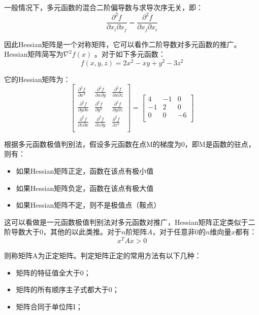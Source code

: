 \documentclass[12pt]{article}
\begin{document}
一般情况下，多元函数的混合二阶偏导数与求导次序无关\cite{Understand_Convex_Optimization}，即：
$$
\frac{\partial^2 f}{\partial x_i\partial x_j} = \frac{\partial^2 f}{\partial x_j\partial x_i}
$$

因此Hessian矩阵是一个对称矩阵，它可以看作二阶导数对多元函数的推广。Hessian矩阵简写为$\nabla^2 f(x)$ 。对于如下多元函数：
$$
f(x,y,z) = 2x^2 - xy + y^2 - 3z^2
$$

它的Hessian矩阵为：
$$
\begin{bmatrix}
\frac{\partial ^2f}{\partial x^2} & \frac{\partial ^2f}{\partial x \partial y} & \frac{\partial ^2f}{\partial x \partial z} \\
\frac{\partial ^2f}{\partial y \partial x} & \frac{\partial ^2f}{\partial y^2} & \frac{\partial ^2f}{\partial y \partial z} \\
\frac{\partial ^2f}{\partial z \partial x} & \frac{\partial ^2f}{\partial z \partial y} & \frac{\partial ^2f}{\partial z^2} \\
\end{bmatrix} = 
\begin{bmatrix}
4 & -1 & 0\\ -1 & 2 & 0\\ 0 & 0 & -6\\
\end{bmatrix}
$$

根据多元函数极值判别法，假设多元函数在点M的梯度为0，即M是函数的驻点，则有：
\begin{itemize}
\setlength{\itemsep}{0pt}
\setlength{\parsep}{0pt}
\setlength{\parskip}{0pt}
    \item 如果Hessian矩阵正定，函数在该点有极小值
    \item 如果Hessian矩阵负定，函数在该点有极大值
    \item 如果Hessian矩阵不定，则不是极值点（鞍点）
\end{itemize}

这可以看做是一元函数极值判别法对多元函数对推广，Hessian矩阵正定类似于二阶导数大于0，其他的以此类推。对于$n$阶矩阵$A$，对于任意非0的$n$维向量$x$都有：
$$
x^TAx > 0
$$

则称矩阵A为正定矩阵。判定矩阵正定的常用方法有以下几种：
\begin{itemize}
\setlength{\itemsep}{0pt}
\setlength{\parsep}{0pt}
\setlength{\parskip}{0pt}
    \item 矩阵的特征值全大于0；
    \item 矩阵的所有顺序主子式都大于0；
    \item 矩阵合同于单位阵I；
\end{itemize}
\end{document}
